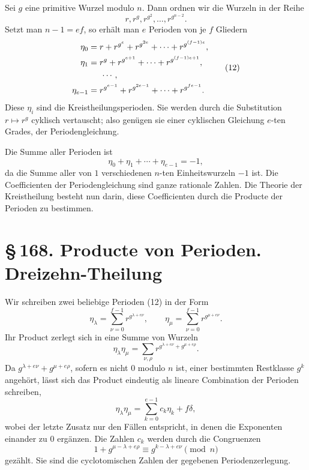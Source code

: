 \documentclass[11pt]{article}
\providecommand{\sect}[2]{\section*{\S\,#1. #2}}
\begin{document}
Sei $g$ eine primitive Wurzel modulo $n$. Dann ordnen wir die Wurzeln in der Reihe
\[
        r,r^g,r^{g^2},\ldots,r^{g^{n-2}}.                              \tag{2}
\]
Setzt man $n-1=ef$, so erhält man $e$ Perioden von je $f$ Gliedern
\[
\begin{aligned}
\eta_0&=r+r^{g^e}+r^{g^{2e}}+
        \cdots+r^{g^{(f-1)e}},\\
\eta_1&=r^g+r^{g^{e+1}}+
        \cdots+r^{g^{(f-1)e+1}},\\
&\hspace{1.5em}\cdots,\\
\eta_{e-1}&=r^{g^{e-1}}+r^{g^{2e-1}}+
        \cdots+r^{g^{fe-1}}.
\end{aligned}                                                          \tag{12}
\]
Diese $\eta_i$ sind die Kreistheilungsperioden. Sie werden durch die Substitution $r\mapsto r^g$ cyklisch vertauscht; also genügen sie einer cyklischen Gleichung $e$-ten Grades, der Periodengleichung.

Die Summe aller Perioden ist
\[
        \eta_0+
        \eta_1+
        \cdots+
        \eta_{e-1}=-1,                                                  \tag{13}
\]
da die Summe aller von $1$ verschiedenen $n$-ten Einheitswurzeln $-1$ ist. Die Coefficienten der Periodengleichung sind ganze rationale Zahlen. Die Theorie der Kreistheilung besteht nun darin, diese Coefficienten durch die Producte der Perioden zu bestimmen.

\sect{168}{Producte von Perioden. Dreizehn-Theilung}

Wir schreiben zwei beliebige Perioden (12) in der Form
\[
        \eta_\lambda=
        \sum_{\nu=0}^{f-1} r^{g^{\lambda+e\nu}},
        \qquad
        \eta_\mu=
        \sum_{\nu=0}^{f-1} r^{g^{\mu+e\nu}} .                           \tag{1}
\]
Ihr Product zerlegt sich in eine Summe von Wurzeln
\[
        \eta_\lambda\eta_\mu=
        \sum_{\nu,\rho} r^{g^{\lambda+e\nu}+g^{\mu+e\rho}}.              \tag{2}
\]
Da $g^{\lambda+e\nu}+g^{\mu+e\rho}$, sofern es nicht $0$ modulo $n$ ist, einer bestimmten Restklasse $g^k$ angehört, lässt sich das Product eindeutig als lineare Combination der Perioden schreiben,
\[
        \eta_\lambda\eta_\mu=
        \sum_{k=0}^{e-1} c_k\eta_k+f\delta,                             \tag{3}
\]
wobei der letzte Zusatz nur den Fällen entspricht, in denen die Exponenten einander zu $0$ ergänzen. Die Zahlen $c_k$ werden durch die Congruenzen
\[
        1+g^{\mu-\lambda+e\rho}
        \equiv g^{k-
\lambda+e\nu}\pmod n                               \tag{4}
\]
gezählt. Sie sind die cyclotomischen Zahlen der gegebenen Periodenzerlegung.
\end{document}
